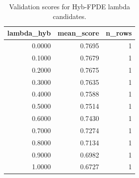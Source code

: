 \begin{table}[t]
\caption{Validation scores for Hyb-FPDE lambda candidates.}
\label{tab:lambda_distribution_computed}
\centering
\begin{tabular}{rrr}
\toprule
lambda\_hyb & mean\_score & n\_rows \\
\midrule
0.0000 & 0.7695 & 1 \\
0.1000 & 0.7679 & 1 \\
0.2000 & 0.7675 & 1 \\
0.3000 & 0.7635 & 1 \\
0.4000 & 0.7588 & 1 \\
0.5000 & 0.7514 & 1 \\
0.6000 & 0.7430 & 1 \\
0.7000 & 0.7274 & 1 \\
0.8000 & 0.7134 & 1 \\
0.9000 & 0.6982 & 1 \\
1.0000 & 0.6727 & 1 \\
\bottomrule
\end{tabular}

\end{table}
